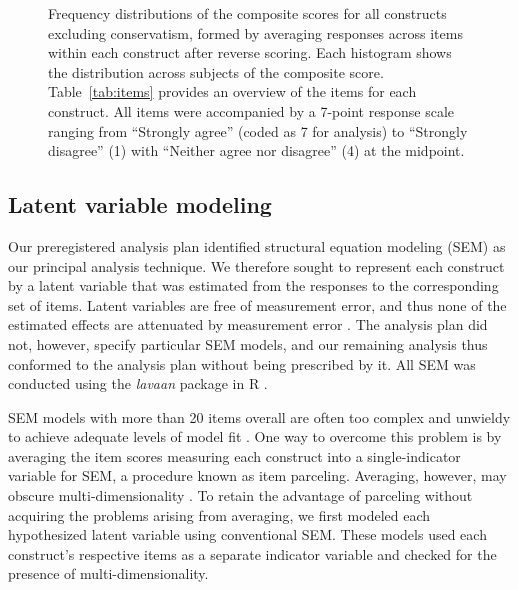 \documentclass[fignum,man]{apa}\usepackage[]{graphicx}\usepackage[]{color}
\begin{document}
\begin{figure}[tp] %
	\caption{Frequency distributions of the composite scores for all constructs
		excluding conservatism,
		formed by averaging responses across items within each construct 
		after
		reverse scoring. Each histogram shows the distribution
		across subjects of the composite score. 		
		Table~\ref{tab:items} provides an overview of the items for
		each construct. All items were accompanied by a 7-point 
		response scale ranging 
		from ``Strongly agree'' (coded as 7 for analysis) to
		 ``Strongly disagree'' (1) with ``Neither agree nor disagree'' (4)
		at the midpoint. }
	\label{fig:histoSocDarw}
\end{figure}

\subsection{Latent variable modeling}
Our
preregistered analysis plan identified structural equation modeling (SEM)
as our principal analysis technique. 
We therefore sought to represent each construct by a 
latent variable that was estimated from the 
responses to the corresponding set of items. 
Latent variables are free of measurement error, and thus none of the estimated effects 
are attenuated by measurement error \cite{Coffman05}. 
The analysis plan did not, however, 
specify particular SEM models, and our 
remaining analysis 
thus conformed to the analysis plan without being 
 prescribed by it.
 All SEM was conducted using the \textit{lavaan} package in R \cite{Rosseel12}.

SEM models with more than 20 items overall are often 
too complex and unwieldy to achieve adequate 
levels of model fit \cite{Bentler87}.
One way to overcome this problem 
is by averaging the item scores measuring 
each construct into a single-indicator 
variable for SEM, a procedure known as item parceling.
Averaging, however, may obscure multi-dimensionality \cite{Little02}. 
To retain the advantage of parceling without acquiring 
the problems arising from averaging, 
we first modeled each hypothesized 
latent variable using conventional SEM. These models
used each construct's respective items as a separate indicator 
variable and checked for the presence of multi-dimensionality.
\end{document}

